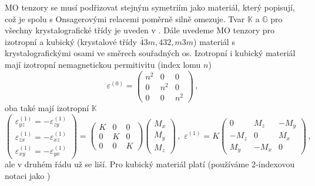 MO tenzory se musí podřizovat stejným symetriím jako materiál, který popisují, což je spolu s Onsagerovými relacemi poměrně silně omezuje.
Tvar $\mathbb{K}$ a $\mathbb{G}$ pro všechny krystalografické třídy je uveden v .
Dále uvedeme MO tenzory pro izotropní a kubický (krystalové třídy $\bar{4}3m, 432, m3m$) materiál s krystalografickými osami ve směrech souřadných os.
Izotropní i kubický materiál mají izotropní nemagnetickou permitivitu (index lomu $n$)
\begin{equation}
    \varepsilon^{(0)}=\begin{pmatrix}
        n^2 & 0 & 0 \\ 0 & n^2 & 0 \\ 0 & 0 & n^2
    \end{pmatrix} \,,
\end{equation}
oba také mají izotropní $\mathbb{K}$
\begin{equation}
    \begin{pmatrix} \varepsilon^{(1)}_{yz}=-\varepsilon^{(1)}_{zy} \\ \varepsilon^{(1)}_{zx}=-\varepsilon^{(1)}_{xz} 
        \\ \varepsilon^{(1)}_{xy}=-\varepsilon^{(1)}_{yx}\end{pmatrix}
    =\begin{pmatrix} K & 0 & 0 \\ 0 & K & 0 \\ 0 & 0 & K \end{pmatrix}
    \begin{pmatrix}M_x \\ M_y \\ M_z\end{pmatrix} 
    \,, \,\, \varepsilon^{(1)}= K 
    \begin{pmatrix} 0 & M_z & -M_y \\ -M_z & 0 & M_x \\ M_y & -M_x & 0 \end{pmatrix} \,,
\end{equation}
ale v druhém řádu už se liší.
Pro kubický materiál platí (používáme 2-indexovou notaci jako )
